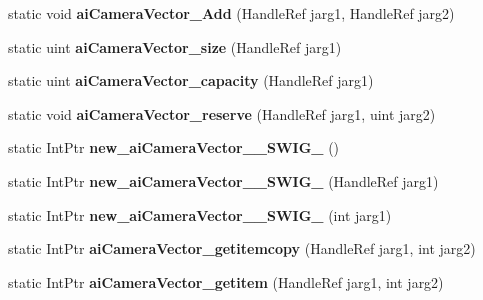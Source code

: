 \begin{DoxyCompactItemize}
\item 
\hypertarget{class_assimp_p_i_n_v_o_k_e_ac92294b488f1ccb0daa663add5e7b9be}{static void {\bfseries ai\+Camera\+Vector\+\_\+\+Add} (Handle\+Ref jarg1, Handle\+Ref jarg2)}\label{class_assimp_p_i_n_v_o_k_e_ac92294b488f1ccb0daa663add5e7b9be}

\item 
\hypertarget{class_assimp_p_i_n_v_o_k_e_a04963b5c0f221224e4b31fb1e0f848e1}{static uint {\bfseries ai\+Camera\+Vector\+\_\+size} (Handle\+Ref jarg1)}\label{class_assimp_p_i_n_v_o_k_e_a04963b5c0f221224e4b31fb1e0f848e1}

\item 
\hypertarget{class_assimp_p_i_n_v_o_k_e_a19bd52e2ff1e24ae92c9d37624840902}{static uint {\bfseries ai\+Camera\+Vector\+\_\+capacity} (Handle\+Ref jarg1)}\label{class_assimp_p_i_n_v_o_k_e_a19bd52e2ff1e24ae92c9d37624840902}

\item 
\hypertarget{class_assimp_p_i_n_v_o_k_e_a3417da89a0c96fe4f16c60253a8794b4}{static void {\bfseries ai\+Camera\+Vector\+\_\+reserve} (Handle\+Ref jarg1, uint jarg2)}\label{class_assimp_p_i_n_v_o_k_e_a3417da89a0c96fe4f16c60253a8794b4}

\item 
\hypertarget{class_assimp_p_i_n_v_o_k_e_ac2f00045f19498f3677963c25e3bcd82}{static Int\+Ptr {\bfseries new\+\_\+ai\+Camera\+Vector\+\_\+\+\_\+\+S\+W\+I\+G\+\_} ()}\label{class_assimp_p_i_n_v_o_k_e_ac2f00045f19498f3677963c25e3bcd82}

\item 
\hypertarget{class_assimp_p_i_n_v_o_k_e_a089b487c14246e2b23ef44868801b2f9}{static Int\+Ptr {\bfseries new\+\_\+ai\+Camera\+Vector\+\_\+\+\_\+\+S\+W\+I\+G\+\_} (Handle\+Ref jarg1)}\label{class_assimp_p_i_n_v_o_k_e_a089b487c14246e2b23ef44868801b2f9}

\item 
\hypertarget{class_assimp_p_i_n_v_o_k_e_ac1ccdbbdc3d5c2657b899968eb9b0582}{static Int\+Ptr {\bfseries new\+\_\+ai\+Camera\+Vector\+\_\+\+\_\+\+S\+W\+I\+G\+\_} (int jarg1)}\label{class_assimp_p_i_n_v_o_k_e_ac1ccdbbdc3d5c2657b899968eb9b0582}

\item 
\hypertarget{class_assimp_p_i_n_v_o_k_e_afd7373d7488f965e240c9fe225d5c0f5}{static Int\+Ptr {\bfseries ai\+Camera\+Vector\+\_\+getitemcopy} (Handle\+Ref jarg1, int jarg2)}\label{class_assimp_p_i_n_v_o_k_e_afd7373d7488f965e240c9fe225d5c0f5}

\item 
\hypertarget{class_assimp_p_i_n_v_o_k_e_a6fb07bb135a54fe161b1f73b67a60de1}{static Int\+Ptr {\bfseries ai\+Camera\+Vector\+\_\+getitem} (Handle\+Ref jarg1, int jarg2)}\label{class_assimp_p_i_n_v_o_k_e_a6fb07bb135a54fe161b1f73b67a60de1}


\end{DoxyCompactItemize}
